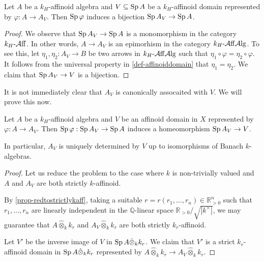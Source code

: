 \begin{proposition}
    Let $A$ be a $k_H$-affinoid algebra and $V\subseteq \operatorname{Sp} A$ be a $k_H$-affinoid domain represented by $\varphi:A\rightarrow A_V$. Then $\operatorname{Sp} \varphi$ induces a bijection $\operatorname{Sp} A_V\rightarrow \operatorname{Sp} A$. 
\end{proposition}
\begin{proof}
    We observe that $\operatorname{Sp} A_V\rightarrow \operatorname{Sp} A$ is a monomorphism in the category $k_H\text{-}\mathcal{A}\mathrm{ff}$. In other words, $A\rightarrow A_V$ is an epimorhism in the category $k_H\text{-}\mathcal{A}\mathrm{ff}\mathcal{A}\mathrm{lg}$. To see this, let $\eta_1,\eta_2:A_V\rightarrow B$ be two arrows in $k_H\text{-}\mathcal{A}\mathrm{ff}\mathcal{A}\mathrm{lg}$ such that $\eta_1\circ \varphi=\eta_2\circ \varphi$. It follows from the universal property in \cref{def-affinoiddomain} that $\eta_1=\eta_2$. We claim that $\operatorname{Sp} A_V\rightarrow V$ is a bijection.
\end{proof}

It is not immediately clear that $A_V$ is canonically assocaited with $V$. We will prove this now.

\begin{proposition}
    Let $A$ be a $k_H$-affinoid algebra and $V$ be an affinoid domain in $X$ represented by $\varphi:A\rightarrow A_V$. Then $\operatorname{Sp} \varphi:\operatorname{Sp} A_V\rightarrow \operatorname{Sp} A$ induces a homeomorphism $\operatorname{Sp} A_V\rightarrow V$.

    In particular, $A_V$ is uniquely determined by $V$ up to isomorphisms of Banach $k$-algebras.
\end{proposition}
\begin{proof}
    Let us reduce the problem to the case where $k$ is non-trivially valued and $A$ and $A_V$ are both strictly $k$-affinoid. 
    
    By \cref{prop-redtostrictlykaff}, taking a suitable $r=r(r_1,\ldots,r_n)\in \mathbb{R}^n_{>0}$ such that $r_1,\ldots,r_n$ are linearly independent in the $\mathbb{Q}$-linear space $\mathbb{R}_{>0}/\sqrt{|k^{\times}|}$, we may guarantee that $A\hat{\otimes}_k k_r$ and $A_V\hat{\otimes}_k k_r$ are both strictly $k_r$-affinoid.

    Let $V'$ be the inverse image of $V$ in $\operatorname{Sp} A\hat{\otimes}_k k_r$. We claim that $V'$ is a strict $k_r$-affinoid domain in $\operatorname{Sp} A\hat{\otimes}_k k_r$ represented by $A\hat{\otimes}_k k_r\rightarrow A_V\hat{\otimes}_k k_r$.
\end{proof}

\printbibliography
